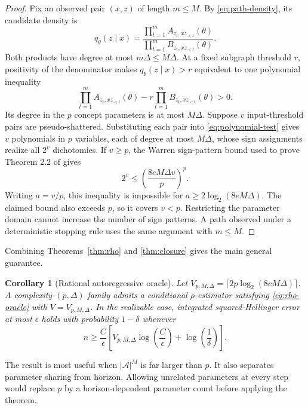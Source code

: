 \documentclass[twoside]{article}
\newtheorem{corollary}[theorem]{Corollary}
\newcommand{\A}{\mathcal A}
\begin{document}
\begin{proof}
Fix an observed pair $(x,z)$ of length $m\leq M$. By \eqref{eq:path-density}, its candidate density is
\[
 q_\theta(z\mid x)=
 \frac{\prod_{t=1}^m A_{z_t,xz_{<t}}(\theta)}
 {\prod_{t=1}^m B_{z_t,xz_{<t}}(\theta)}.
\]
Both products have degree at most $m\Delta\leq M\Delta$. At a fixed subgraph threshold $r$, positivity of the denominator makes $q_\theta(z\mid x)>r$ equivalent to one polynomial inequality
\begin{equation}
 \prod_{t=1}^m A_{z_t,xz_{<t}}(\theta)
 -r\prod_{t=1}^m B_{z_t,xz_{<t}}(\theta)>0.
 \label{eq:polynomial-test}
\end{equation}
Its degree in the $p$ concept parameters is at most $M\Delta$. Suppose $v$ input-threshold pairs are pseudo-shattered. Substituting each pair into \eqref{eq:polynomial-test} gives $v$ polynomials in $p$ variables, each of degree at most $M\Delta$, whose sign assignments realize all $2^v$ dichotomies. If $v\geq p$, the Warren sign-pattern bound used to prove Theorem 2.2 of \citet{goldberg1995} gives
\[
 2^v\leq\left(\frac{8eM\Delta v}{p}\right)^p.
\]
Writing $a=v/p$, this inequality is impossible for $a\geq2\log_2(8eM\Delta)$. The claimed bound also exceeds $p$, so it covers $v<p$. Restricting the parameter domain cannot increase the number of sign patterns. A path observed under a deterministic stopping rule uses the same argument with $m\leq M$.
\end{proof}

Combining Theorems~\ref{thm:rho} and \ref{thm:closure} gives the main general guarantee.

\begin{corollary}[Rational autoregressive oracle]
\label{cor:rational}
Let $V_{p,M,\Delta}=\lceil2p\log_2(8eM\Delta)\rceil$. A complexity-$(p,\Delta)$ family admits a conditional $\rho$-estimator satisfying \eqref{eq:rho-oracle} with $V=V_{p,M,\Delta}$. In the realizable case, integrated squared-Hellinger error at most $\epsilon$ holds with probability $1-\delta$ whenever
\begin{equation}
 n\geq\frac{C}{\epsilon}\left[V_{p,M,\Delta}\log\!\left(\frac C\epsilon\right)+\log\!\left(\frac1\delta\right)\right].
 \label{eq:sample-rational}
\end{equation}
\end{corollary}

The result is most useful when $|\A|^M$ is far larger than $p$. It also separates parameter sharing from horizon. Allowing unrelated parameters at every step would replace $p$ by a horizon-dependent parameter count before applying the theorem.
\end{document}
